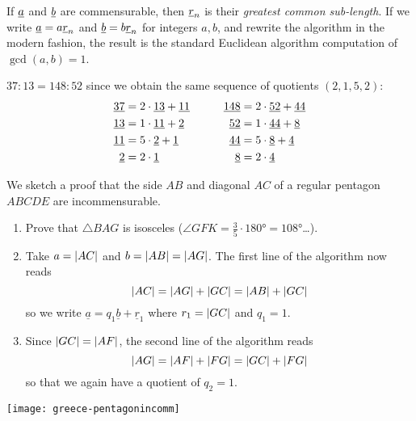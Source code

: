 
If $\underline a$ and $\underline b$ are commensurable, then $\underline r_n$ is their \emph{greatest common sub-length}. If we write $\underline a=a\underline r_n$ and $\underline b=b\underline r_n$ for integers $a,b$, and rewrite the algorithm in the modern fashion, the result is the standard Euclidean algorithm computation of $\gcd(a,b)=1$.

$37:13=148:52$ since we obtain the same sequence of quotients $(2,1,5,2)$:
\begin{align*}
	\underline{37}&=2\cdot\underline{13}+\underline{11}\qquad &\underline{148}&=2\cdot\underline{52}+\underline{44}\\
	\underline{13}&=1\cdot\underline{11}+\underline{2}\qquad &\underline{52}&=1\cdot\underline{44}+\underline{8}\\
	\underline{11}&=5\cdot\underline{2}+\underline{1}\qquad &\underline{44}&=5\cdot\underline{8}+\underline{4}\\
	\underline{2}&=2\cdot\underline{1}\qquad &\underline{8}&=2\cdot\underline{4}
\end{align*}

\goodbreak

\label{ex:theaetetus} We sketch a proof that the side $AB$ and diagonal $AC$ of a regular pentagon $ABCDE$ are incommensurable.\par
\begin{minipage}[t]{0.65\linewidth}\vspace{-5pt}
	\begin{enumerate}\itemsep0pt
	  \item Prove that $\triangle BAG$ is isosceles ($\angle GFK=\frac 35\cdot\ang{180}=\ang{108}$\ldots).
	  \item Take $a=\left| AC\right|$ and $b=\left| AB\right|=\left| AG\right|$. The first line of the algorithm now reads
	  \[
	  	\left| AC\right|=\left| AG\right|+\left| GC\right|=\left| AB\right|+\left| GC\right|
	  \]
	  so we write $\underline a=q_1\underline b+\underline r_1$ where $r_1=\left| GC\right|$ and $q_1=1$.
	  \item Since $\left| GC\right|=\left| AF\right|$, the second line of the algorithm reads
	  \[
	  	\left| AG\right|=\left| AF\right|+\left| FG\right|=\left| GC\right|+\left| FG\right|
	  \]
	  so that we again have a quotient of $q_2=1$.
	\end{enumerate}
\end{minipage}
\hfill
\begin{minipage}[t]{0.34\textwidth}\vspace{-5pt}
	\flushright
	\texttt{[image: greece-pentagonincomm]}
\end{minipage}
	
